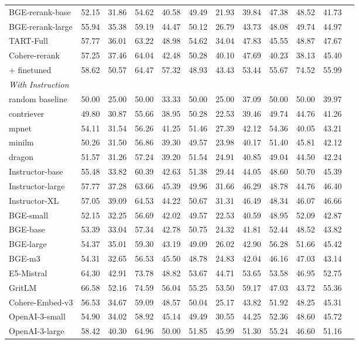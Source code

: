 \begin{table}[!tp]
{\begin{tabular}{lcccccc|c|cc|cc}
\midrule
BGE-rerank-base &52.15 &31.86 &54.62 &40.58 &49.49 &21.93 &39.84 &47.38 &48.52 &41.73 \\
BGE-rerank-large &55.94 &35.38 &59.19 &44.47 &50.12 &26.79 &43.73 &48.08 &49.74 &44.97 \\
TART-Full &57.77 &36.01 &63.22 &48.98 &54.62 &34.04 &47.83 &45.55 &48.87 &47.67 \\
Cohere-rerank &57.25 &37.46 &64.04 &42.48 &50.28 &40.10 &47.69 &40.23 &38.13 &45.40 \\
\quad + finetuned &58.62 &50.57 &64.47 &57.32 &48.93 &43.43 &53.44 &55.67 &74.52 &55.99 \\
\midrule
\multicolumn{11}{l}{\textit{With Instruction}} \\
\midrule
random baseline	&50.00	&25.00	&50.00&	33.33	&50.00	&25.00	&37.09	&50.00&	50.00	&39.97\\
contriever &49.80 &30.87 &55.66 &38.95 &50.28 &22.53 &39.46 &49.74 &44.76 &41.26 \\
mpnet &54.11 &31.54 &56.26 &41.25 &51.46 &27.39 &42.12 &54.36 &40.05 &43.21 \\
minilm &50.26 &31.50 &56.86 &39.30 &49.57 &23.98 &40.17 &51.40 &45.81 &42.12 \\
dragon &51.57 &31.26 &57.24 &39.20 &51.54 &24.91 &40.85 &49.04 &44.50 &42.24 \\
Instructor-base &55.48 &33.82 &60.39 &42.63 &51.38 &29.44 &44.05 &48.60 &50.70 &45.39 \\
Instructor-large &57.77 &37.28 &63.66 &45.39 &49.96 &31.66 &46.29 &48.78 &44.76 &46.40 \\
Instructor-XL &57.05 &39.09 &64.53 &44.22 &50.67 &31.31 &46.49 &48.34 &46.07 &46.66 \\
BGE-small &52.15 &32.25 &56.69 &42.02 &49.57 &22.53 &40.59 &48.95 &52.09 &42.87 \\
BGE-base &53.39 &33.04 &57.34 &42.78 &50.75 &24.32 &41.81 &52.44 &48.52 &43.82 \\
BGE-large &54.37 &35.01 &59.30 &43.19 &49.09 &26.02 &42.90 &56.28 &51.66 &45.42 \\
BGE-m3 &54.31 &32.65 &56.53 &45.50 &48.78 &24.83 &42.04 &46.16 &47.03 &43.14 \\
E5-Mistral &64.30 &42.91 &73.78 &48.82 &53.67 &44.71 &53.65 &53.58 &46.95 &52.75 \\
GritLM &66.58 &52.16 &74.59 &56.04 &55.25 &53.50 &59.17 &47.03 &43.72 &55.36 \\
Cohere-Embed-v3	&56.53	&34.67	&59.09	&48.57	&50.04	&25.17	&43.82	&51.92	&48.25	&45.31\\
OpenAI-3-small	&54.90 	&34.02 	&58.92 	&45.14 	&49.49 	&30.55 	&44.25 	&52.36 	&48.60 	&45.72  \\
OpenAI-3-large	&58.42 	&40.30 	&64.96 	&50.00 	&51.85 	&45.99 	&51.30 	&55.24 	&46.60 	&51.16  \\


\end{tabular}}
\end{table}
